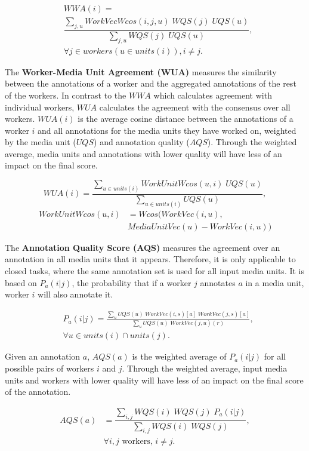 \begin{align*}
& WWA(i) = \\
& \dfrac{ \sum\limits_{j, u} WorkVecWcos(i,j,u) \; WQS(j) \; UQS(u) }{ \sum\limits_{j, u} WQS(j) \; UQS(u) }, \\
& \forall j \in workers(u \in units(i)), i \neq j .
\end{align*}

The \textbf{Worker-Media Unit Agreement (WUA)} measures the similarity between the annotations of a worker and the aggregated annotations of the rest of the workers. In contrast to the $WWA$ which calculates agreement with individual workers, $WUA$ calculates the agreement with the consensus over all workers. $WUA(i)$ is the average cosine distance between the annotations of a worker $i$ and all annotations for the media units they have worked on, weighted by the media unit ($UQS$) and annotation quality ($AQS$). Through the weighted average, media units and annotations with lower quality will have less of an impact on the final score.

$$ WUA(i) = \dfrac{\sum\limits_{u \in units(i)} WorkUnitWcos(u, i) \; UQS(u)}{\sum\limits_{u \in units(i)} UQS(u)}, $$
\begin{align*}
 WorkUnitWcos(u, i) & = Wcos(WorkVec(i,u), \\
       &MediaUnitVec(u) - WorkVec(i, u))
\end{align*}

The \textbf{Annotation Quality Score (AQS)} measures the agreement over an annotation in all media units that it appears. Therefore, it is only applicable to closed tasks, where the same annotation set is used for all input media units. It is based on $P_a(i | j)$, the probability that if a worker $j$ annotates $a$ in a media unit, worker $i$ will also annotate it.

\begin{align*}
& P_a(i | j) = \frac{ \sum\limits_{u} UQS(u) \; WorkVec(i, s)[a] \; WorkVec(j, s)[a] }{ \sum\limits_{u} UQS(u) \; WorkVec(j, u)(r) }, \\
& \forall u \in units(i) \cap units(j).
\end{align*}

Given an annotation $a$, $AQS(a)$ is the weighted average of $P_a(i | j)$ for all possible pairs of workers $i$ and $j$. Through the weighted average, input media units and workers with lower quality will have less of an impact on the final score of the annotation.

\begin{align*}
AQS(a) &= \dfrac{ \sum\limits_{i,j} WQS(i) \; WQS(j) \; P_a(i | j) }{ \sum\limits_{i,j} WQS(i) \; WQS(j) }, \\
& \forall i, j \text{ workers, }  i \neq j .
\end{align*}

